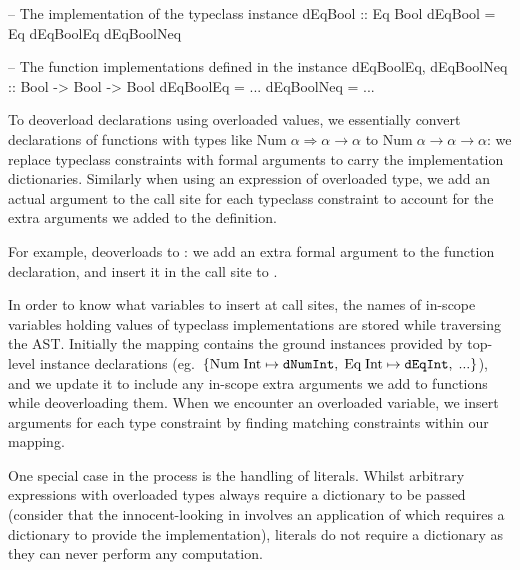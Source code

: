 \documentclass[dissertation.tex]{subfiles}
\begin{document}
{{{\begin{haskellfigure}
            -- The implementation of the typeclass instance
            dEqBool :: Eq Bool
            dEqBool = Eq dEqBoolEq dEqBoolNeq

            -- The function implementations defined in the instance
            dEqBoolEq, dEqBoolNeq :: Bool -> Bool -> Bool
            dEqBoolEq = ...
            dEqBoolNeq = ...
            \end{haskellfigure}


            To deoverload declarations using overloaded values, we essentially convert declarations of functions with
            types like \(\text{Num}\;\alpha\Rightarrow\alpha\rightarrow\alpha\) to
            \(\text{Num}\;\alpha\rightarrow\alpha\rightarrow\alpha\): we replace typeclass constraints with formal
            arguments to carry the implementation dictionaries. Similarly when using an expression of overloaded type,
            we add an actual argument to the call site for each typeclass constraint to account for the extra arguments
            we added to the definition.
            
            For example,  deoverloads to : we add an extra
            formal argument to the function declaration, and insert it in the call site to \haskell{+}.

            In order to know what variables to insert at call sites, the names of in-scope variables holding values of
            typeclass implementations are stored while traversing the AST. Initially the mapping contains the ground
            instances provided by top-level instance declarations (eg.\
            \(\{\text{Num\;Int}\mapsto\texttt{dNumInt},\;\text{Eq\;Int}\mapsto\texttt{dEqInt},\;...\}\)), and we update
            it to include any in-scope extra arguments we add to functions while deoverloading them. When we encounter
            an overloaded variable, we insert arguments for each type constraint by finding matching constraints within
            our mapping.

            One special case in the process is the handling of literals. Whilst arbitrary expressions with overloaded
            types always require a dictionary to be passed (consider that the innocent-looking \haskell{x} in
            \haskell{let x = 1 + 2 in x} involves an application of \haskell{+} which requires a dictionary to provide
            the implementation), literals do not require a dictionary as they can never perform any computation.

}}}
\end{document}
